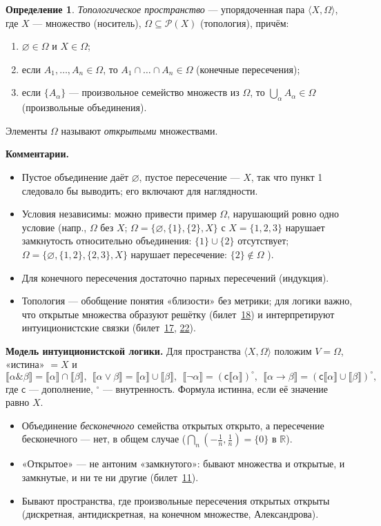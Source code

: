 \documentclass[11pt,a4paper]{article}
\newcommand{\amp}{\mathbin{\&}}
\newcommand{\sem}[1]{\llbracket #1\rrbracket}
\newcommand{\cmpl}{\mathsf{c}}
\newcommand{\bbR}{\mathbb{R}}
\theoremstyle{definition}
\newtheorem*{dfn}{Определение}
\begin{document}
\begin{dfn}
\emph{Топологическое пространство} --- упорядоченная пара $\langle X,\Omega\rangle$, где $X$ --- множество (носитель), $\Omega\subseteq\mathcal{P}(X)$ (топология), причём:
\begin{enumerate}
\item $\varnothing\in\Omega$ и $X\in\Omega$;
\item если $A_1,\dots,A_n\in\Omega$, то $A_1\cap\dots\cap A_n\in\Omega$ (конечные пересечения);
\item если $\{A_\alpha\}$ --- произвольное семейство множеств из $\Omega$, то $\bigcup_\alpha A_\alpha\in\Omega$ (произвольные объединения).
\end{enumerate}
Элементы $\Omega$ называют \emph{открытыми} множествами.
\end{dfn}

\textbf{Комментарии.}
\begin{itemize}
\item Пустое объединение даёт $\varnothing$, пустое пересечение --- $X$, так что пункт 1 следовало бы выводить; его включают для наглядности.
\item Условия независимы: можно привести пример $\Omega$, нарушающий ровно одно условие (напр., $\Omega$ без $X$; $\Omega=\{\varnothing,\{1\},\{2\},X\}$ с $X=\{1,2,3\}$ нарушает замкнутость относительно объединения: $\{1\}\cup\{2\}$ отсутствует; $\Omega=\{\varnothing,\{1,2\},\{2,3\},X\}$ нарушает пересечение: $\{2\}\notin\Omega$ ).
\item Для конечного пересечения достаточно парных пересечений (индукция).
\item Топология --- обобщение понятия «близости» без метрики; для логики важно, что открытые множества образуют решётку (билет~\hyperref[T:18]{18}) и интерпретируют интуиционистские связки (билет~\hyperref[T:17]{17}, \hyperref[T:22]{22}).
\end{itemize}

\textbf{Модель интуиционистской логики.} Для пространства $\langle X,\Omega\rangle$ положим $V=\Omega$, «истина» $=X$ и
\[
\sem{\alpha\amp\beta}=\sem{\alpha}\cap\sem{\beta},\ \ \sem{\alpha\vee\beta}=\sem{\alpha}\cup\sem{\beta},\ \
\sem{\neg\alpha}=(\cmpl\sem{\alpha})^\circ,\ \ \sem{\alpha\to\beta}=(\cmpl\sem{\alpha}\cup\sem{\beta})^\circ,
\]
где $\cmpl$ --- дополнение, $^\circ$ --- внутренность. Формула истинна, если её значение равно $X$.

\begin{warn}
\begin{itemize}
\item Объединение \emph{бесконечного} семейства открытых открыто, а пересечение бесконечного --- нет, в общем случае ($\bigcap_n(-\tfrac1n,\tfrac1n)=\{0\}$ в $\bbR$).
\item «Открытое» --- не антоним «замкнутого»: бывают множества и открытые, и замкнутые, и ни те ни другие (билет~\hyperref[T:11]{11}).
\item Бывают пространства, где произвольные пересечения открытых открыты (дискретная, антидискретная, на конечном множестве, Александрова).
\end{itemize}
\end{warn}
\end{document}
